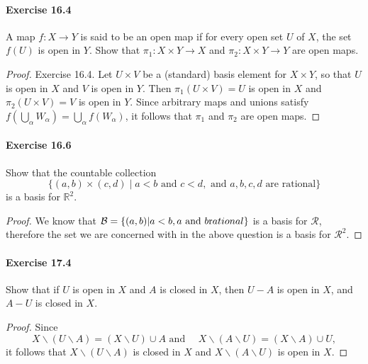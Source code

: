 \documentclass{article}
\begin{document}
\paragraph{Exercise 16.4} A map $f: X \rightarrow Y$ is said to be an open map if for every open set $U$ of $X$, the set $f(U)$ is open in $Y$. Show that $\pi_{1}: X \times Y \rightarrow X$ and $\pi_{2}: X \times Y \rightarrow Y$ are open maps.
\begin{proof}
    Exercise 16.4. Let $U \times V$ be a (standard) basis element for $X \times Y$, so that $U$ is open in $X$ and $V$ is open in $Y$. Then $\pi_1(U \times V)=U$ is open in $X$ and $\pi_2(U \times V)=V$ is open in $Y$. Since arbitrary maps and unions satisfy $f\left(\bigcup_\alpha W_\alpha\right)=\bigcup_\alpha f\left(W_\alpha\right)$, it follows that $\pi_1$ and $\pi_2$ are open maps.
\end{proof}



\paragraph{Exercise 16.6} Show that the countable collection \[\{(a, b) \times (c, d) \mid a < b \text{ and } c < d, \text{ and } a, b, c, d \text{ are rational}\}\] is a basis for $\mathbb{R}^2$.
\begin{proof}
    We know that $\mathcal{B}=\{(a,b)|a<b, a \text{ and } b \text rational\}$ is a basis for $\mathcal{R}$, therefore the set we are concerned with in the above question is a basis for $\mathcal{R}^2$. 
\end{proof}



\paragraph{Exercise 17.4} Show that if $U$ is open in $X$ and $A$ is closed in $X$, then $U-A$ is open in $X$, and $A-U$ is closed in $X$.
\begin{proof}
Since
$$
X \backslash(U \backslash A)=(X \backslash U) \cup A \text { and } \quad X \backslash(A \backslash U)=(X \backslash A) \cup U,
$$
it follows that $X \backslash(U \backslash A)$ is closed in $X$ and $X \backslash(A \backslash U)$ is open in $X$.
\end{proof}
\end{document}

